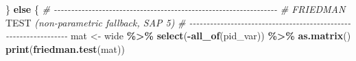 \documentclass[
]{article}
\newenvironment{Shaded}{\begin{snugshade}}{\end{snugshade}}
\newcommand{\AlertTok}[1]{\textcolor[rgb]{0.94,0.16,0.16}{#1}}
\newcommand{\CommentTok}[1]{\textcolor[rgb]{0.56,0.35,0.01}{\textit{#1}}}
\newcommand{\ControlFlowTok}[1]{\textcolor[rgb]{0.13,0.29,0.53}{\textbf{#1}}}
\newcommand{\FunctionTok}[1]{\textcolor[rgb]{0.13,0.29,0.53}{\textbf{#1}}}
\newcommand{\NormalTok}[1]{#1}
\newcommand{\OtherTok}[1]{\textcolor[rgb]{0.56,0.35,0.01}{#1}}
\newcommand{\SpecialCharTok}[1]{\textcolor[rgb]{0.81,0.36,0.00}{\textbf{#1}}}
\begin{document}
\begin{Shaded}
\begin{Highlighting}[]
\NormalTok{  \} }\ControlFlowTok{else}\NormalTok{ \{}
    \CommentTok{\# {-}{-}{-}{-}{-}{-}{-}{-}{-}{-}{-}{-}{-}{-}{-}{-}{-}{-}{-}{-}{-}{-}{-}{-}{-}{-}{-}{-}{-}{-}{-}{-}{-}{-}{-}{-}{-}{-}{-}{-}{-}{-}{-}{-}{-}{-}{-}{-}{-}{-}{-}{-}{-}{-}{-}{-}{-}{-}{-}{-}{-}{-}{-}{-}{-}}
    \CommentTok{\# FRIEDMAN }\AlertTok{TEST}\CommentTok{ (non{-}parametric fallback, SAP 5)}
    \CommentTok{\# {-}{-}{-}{-}{-}{-}{-}{-}{-}{-}{-}{-}{-}{-}{-}{-}{-}{-}{-}{-}{-}{-}{-}{-}{-}{-}{-}{-}{-}{-}{-}{-}{-}{-}{-}{-}{-}{-}{-}{-}{-}{-}{-}{-}{-}{-}{-}{-}{-}{-}{-}{-}{-}{-}{-}{-}{-}{-}{-}{-}{-}{-}{-}{-}{-}}
\NormalTok{    mat }\OtherTok{\textless{}{-}}\NormalTok{ wide }\SpecialCharTok{\%\textgreater{}\%} \FunctionTok{select}\NormalTok{(}\SpecialCharTok{{-}}\FunctionTok{all\_of}\NormalTok{(pid\_var)) }\SpecialCharTok{\%\textgreater{}\%} \FunctionTok{as.matrix}\NormalTok{()}
    \FunctionTok{print}\NormalTok{(}\FunctionTok{friedman.test}\NormalTok{(mat))}


\end{Highlighting}
\end{Shaded}
\end{document}
